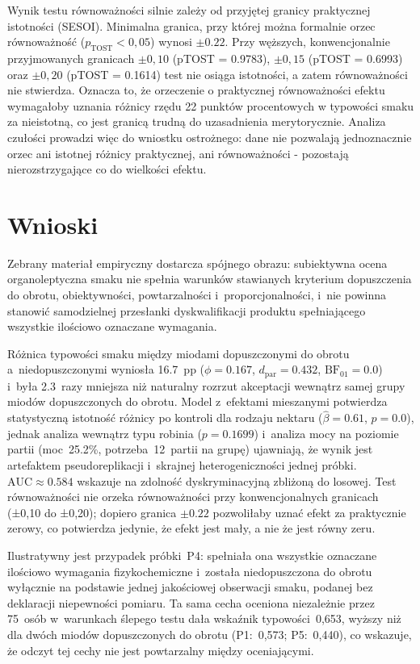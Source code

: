 Wynik testu równoważności silnie zależy od przyjętej granicy praktycznej istotności (SESOI). 
Minimalna granica, przy której można formalnie orzec równoważność ($p_{\mathrm{TOST}} < 0{,}05$) wynosi $\pm 0.22$.
Przy węższych, konwencjonalnie przyjmowanych granicach 
$\pm 0{,}10$ (pTOST = 0.9783), $\pm 0{,}15$ (pTOST = 0.6993) oraz $\pm 0{,}20$ (pTOST = 0.1614) 
test nie osiąga istotności, a zatem równoważności nie stwierdza. 
Oznacza to, że orzeczenie o praktycznej równoważności efektu wymagałoby uznania różnicy rzędu 22 punktów procentowych 
w typowości smaku za nieistotną, co jest granicą trudną do uzasadnienia merytorycznie. 
Analiza czułości prowadzi więc do wniostku ostrożnego: dane nie pozwalają jednoznacznie orzec 
ani istotnej różnicy praktycznej, ani równoważności - pozostają nierozstrzygające co do wielkości efektu.

\section{Wnioski}

Zebrany materiał empiryczny dostarcza spójnego obrazu: subiektywna ocena
organoleptyczna smaku nie spełnia warunków stawianych kryterium
dopuszczenia do obrotu, obiektywności, powtarzalności i~proporcjonalności, 
i~nie powinna stanowić samodzielnej przesłanki dyskwalifikacji produktu
spełniającego wszystkie ilościowo oznaczane wymagania.

Różnica typowości smaku między miodami dopuszczonymi do obrotu
a~niedopuszczonymi wyniosła 16.7~pp
($\phi = 0.167$, $d_{\mathrm{par}} = 0.432$,
$\mathrm{BF}_{01} = 0.0$) i~była 2.3~razy mniejsza
niż naturalny rozrzut akceptacji wewnątrz samej grupy miodów dopuszczonych
do obrotu.
Model z~efektami mieszanymi potwierdza statystyczną istotność różnicy po
kontroli dla rodzaju nektaru ($\hat{\beta} = 0.61$,
$p = 0.0$), jednak analiza wewnątrz typu robinia ($p = 0.1699$)
i~analiza mocy na poziomie partii (moc~25.2\%,
potrzeba~12~partii na grupę) ujawniają, że wynik jest
artefaktem pseudoreplikacji i~skrajnej heterogeniczności jednej próbki.
$\mathrm{AUC} \approx 0.584$ wskazuje na zdolność dyskryminacyjną
zbliżoną do losowej.
Test równoważności nie orzeka równoważności przy konwencjonalnych granicach (±0,10 do ±0,20); dopiero granica $\pm 0.22$  
pozwoliłaby uznać efekt za praktycznie zerowy, co potwierdza jedynie, że efekt jest mały, a nie że jest równy zeru.

Ilustratywny jest przypadek próbki~P4: spełniała ona wszystkie oznaczane
ilościowo wymagania fizykochemiczne i~została niedopuszczona do obrotu
wyłącznie na podstawie jednej jakościowej obserwacji smaku, podanej bez
deklaracji niepewności pomiaru.
Ta sama cecha oceniona niezależnie przez 75~osób w~warunkach ślepego testu dała
wskaźnik typowości~0{,}653, wyższy niż dla dwóch miodów dopuszczonych do
obrotu (P1:~0{,}573; P5:~0{,}440), co wskazuje, że odczyt tej cechy nie jest
powtarzalny między oceniającymi.


